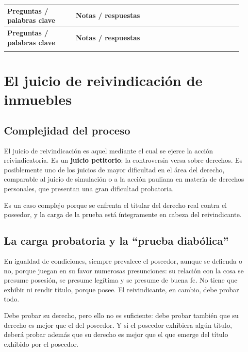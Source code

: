 \documentclass[12pt,oneside]{book}
\makeatletter
\newenvironment{cornell}{%
    \par\vspace{0.5em}
    \begin{longtable}{@{}>{\RaggedRight\arraybackslash}p{0.28\linewidth}
                         >{\RaggedRight\arraybackslash}p{0.68\linewidth}@{}}
    \toprule
    \textbf{Preguntas / palabras clave} & \textbf{Notas / respuestas} \\
    \midrule
    \endfirsthead
    \toprule
    \textbf{Preguntas / palabras clave} & \textbf{Notas / respuestas} \\
    \midrule
    \endhead
}{%
    \bottomrule
    \end{longtable}
}
\newcommand{\cornellsummary}[1]{%
    \midrule
    \multicolumn{2}{@{}p{\dimexpr0.96\linewidth+2\tabcolsep\relax}@{}}{%
        \textbf{Resumen:} #1} \\
}
\makeatother
\begin{document}
\begin{cornell}
\cornellsummary{La negatoria actúa ante la turbación (intención de poseer o ejercicio más allá de los límites) y busca hacer cesar la turbación; la confesoria, de carácter residual, protege la plenitud del derecho ante el impedimento de su ejercicio, incluidas las servidumbres activas y las restricciones por vecindad; el deslinde no supone un ataque, sino una incertidumbre compartida sobre los límites de fondos contiguos. En todos los casos la legitimación activa corresponde al titular del derecho real y, en supuestos específicos, al acreedor hipotecario.}
\end{cornell}

\chapter[El juicio de reivindicación de inmuebles]{El juicio de reivindicación de inmuebles}

\section{Complejidad del proceso}

El juicio de reivindicación es aquel mediante el cual se ejerce la acción reivindicatoria. Es un \textbf{juicio petitorio}: la controversia versa sobre derechos. Es posiblemente uno de los juicios de mayor dificultad en el área del derecho, comparable al juicio de simulación o a la acción pauliana en materia de derechos personales, que presentan una gran dificultad probatoria.

Es un caso complejo porque se enfrenta el titular del derecho real contra el poseedor, y la carga de la prueba está íntegramente en cabeza del reivindicante.

\section{La carga probatoria y la ``prueba diabólica''}

En igualdad de condiciones, siempre prevalece el poseedor, aunque se defienda o no, porque juegan en su favor numerosas presunciones: su relación con la cosa se presume posesión, se presume legítima y se presume de buena fe. No tiene que exhibir ni rendir título, porque posee. El reivindicante, en cambio, debe probar todo.

Debe probar su derecho, pero ello no es suficiente: debe probar también que su derecho es mejor que el del poseedor. Y si el poseedor exhibiera algún título, deberá probar además que su derecho es mejor que el que emerge del título exhibido por el poseedor.
\end{document}
